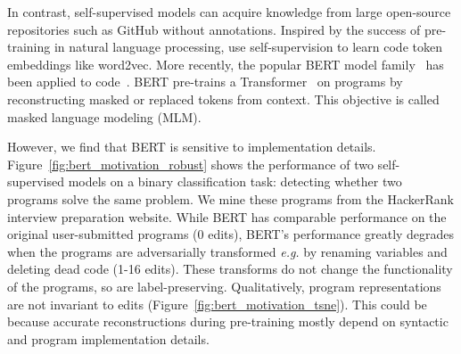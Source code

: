 \documentclass{article}
\begin{document}
In contrast, self-supervised models can acquire knowledge from large open-source repositories such as GitHub without annotations.
Inspired by the success of pre-training in natural language processing, \citet{ben2018neural} use self-supervision to learn code token embeddings like word2vec. More recently, the popular BERT model family~\cite{devlin2018bert} has been applied to code~\citep{cuBERT,feng2020codebert,guo2020graphcodebert}. BERT pre-trains a Transformer~\cite{vaswani2017attention} on programs by reconstructing masked or replaced tokens from context. This objective is called masked language modeling (MLM).

However, we find that BERT is sensitive to implementation details. Figure~\ref{fig:bert_motivation_robust} shows the performance of two self-supervised models on a binary classification task: detecting whether two programs solve the same problem. We mine these programs from the HackerRank interview preparation website. While BERT has comparable performance on the original user-submitted programs (0 edits), BERT's performance greatly degrades when the programs are adversarially transformed \textit{e.g.} by renaming variables and deleting dead code (1-16 edits). These transforms do not change the functionality of the programs, so are label-preserving. Qualitatively, program representations are not invariant to edits (Figure~\ref{fig:bert_motivation_tsne}). This could be because accurate reconstructions during pre-training mostly depend on syntactic and program implementation details.
\end{document}
